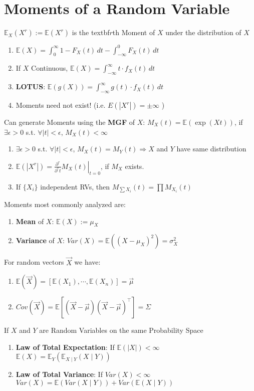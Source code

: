\documentclass[a4paper,portrait,columns=2, hidelinks]{cheatsheet}
\begin{document}
\section{Moments of a Random Variable}
\(\mathbb{E}_X(X^r) := \mathbb{E}(X^r)\) is the textbf{\(r\)th Moment} of \(X\) under the distribution of \(X\)
\begin{enumerate}
	\item \(\mathbb{E}(X) = \int_0^\infty 1 - F_X(t)\,dt - \int_{-\infty}^0 F_X(t)\,dt\)
	\item If \(X\) Continuous, \(\mathbb{E}(X) = \int_{-\infty}^{\infty} t \cdot f_X(t)\,dt\)
	\item \textbf{LOTUS}: \(\mathbb{E}(g(X)) = \int_{-\infty}^{\infty} g(t) \cdot f_X(t)\,dt\)
	\item Moments need not exist! (i.e. \(E(|X^r|)=\pm\infty\) )
\end{enumerate}
Can generate Moments using the \textbf{MGF} of \(X\): \( M_X(t) = \mathbb{E} \left(\exp(Xt) \right) \), if \( \exists \epsilon >0 \) s.t. \( \forall |t| < \epsilon\),  \(M_X(t) < \infty \)
\begin{enumerate}
	\item \( \exists \epsilon >0 \) s.t. \( \forall |t| < \epsilon\),  \(M_X(t) = M_Y(t) \Rightarrow X\) and \(Y\) have same distribution
	\item \(\mathbb{E}(|X^r|) = \left.\frac{\partial^r}{\partial^r t}M_X(t)\right\rvert_{t=0}\), if \(M_X\) exists.
	\item If \(\{ X_i\}\) independent RVs, then \( M_{\sum X_i} (t) = \prod M_{X_i}(t)\)
\end{enumerate}

Moments most commonly analyzed are:
\begin{enumerate}
	\item \textbf{Mean} of \(X\): \(\mathbb{E}(X):=\mu_X\)
	\item \textbf{Variance} of \(X\): \(Var(X)=\mathbb{E}((X-\mu_{X})^2)=\sigma^2_{X}\)
\end{enumerate}

For random vectors \(\vec{X}\) we have:
\begin{enumerate}
	\item \(\mathbb{E}(\vec{X}) = [\mathbb{E}(X_1), \cdots, \mathbb{E}(X_n)]=\vec{\mu}\)
	\item \(Cov(\vec{X})= \mathbb{E}[(\vec{X}-\vec{\mu})(\vec{X}-\vec{\mu})^\intercal] = \Sigma\)
\end{enumerate}

If \(X\) and \(Y\) are Random Variables on the same Probability Space
\begin{enumerate}
	\item \textbf{Law of Total Expectation}: If \(\mathbb{E}(|X|)<\infty\) \(\mathbb{E}(X)=\mathbb{E}_{Y}(\mathbb{E}_{X \mid Y}(X \mid Y))\)
	\item \textbf{Law of Total Variance}: If \(Var(X)<\infty\)
	\(Var(X)=\mathbb{E}(Var(X \mid Y))+Var(\mathbb{E}(X \mid Y))\)
\end{enumerate}
\end{document}
